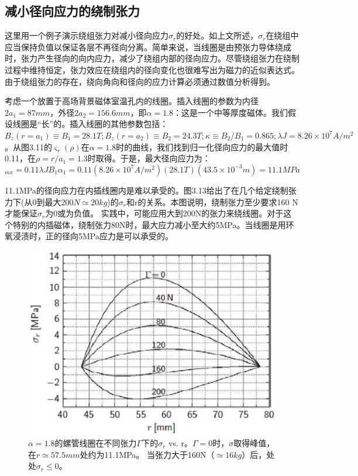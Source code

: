 \subsection{减小径向应力的绕制张力}
这里用一个例子演示绕组张力对减小径向应力$\sigma_{r}$的好处。如上文所述，$\sigma_{r}$在绕组中应当保持负值以保证各层不再径向分离。简单来说，当线圈是由预张力导体绕成时，张力产生径向的向内应力，减少了绕组内部的径向应力。尽管绕组张力在绕制过程中维持恒定，张力效应在绕组内的径向变化也很难写出为磁力的近似表达式。由于绕组张力的存在，绕向角向和径向的应力计算必须通过数值分析得到。

考虑一个放置于高场背景磁体室温孔内的线圈。插入线圈的参数为内径$2a_1=87 mm$，外径$2a_2=156.6 mm$，即$\alpha = 1.8$：这是一个中等厚度磁体。我们假设线圈是“长”的。插入线圈的其他参数包括：
$B_z(r=a_1)\equiv B_1 =28.1 T; B_z(r=a_2)\equiv B_2 =24.3 T;\kappa\equiv B_2/B_1 = 0.865; \lambda J =8.26×10^7 A/m^2$。从图3.11的$\varsigma_r(\rho)$在$\alpha=1.8$时的曲线，我们找到归一化径向应力的最大值时0.11，在$\rho=r/a_1=1.3$时取得。于是，最大径向应力为：
\begin{equation}
  [\sigma_r]_{mx}=0.11\lambda JB_1\alpha_1  =0.11(8.26\times 10^7 A/m^2)(28.1T)(43.5\times10^{-3}m)=11.1MPa%
\end{equation}

11.1MPa的径向应力在内插线圈内是难以承受的。图3.13给出了在几个给定绕制张力下(从0到最大$200 N\simeq 20 kg$)的$\sigma_{r}$和r的关系。本图说明，绕制张力至少要求160 N才能保证$\sigma_{r}$为0或为负值。
实践中，可能应用大到200N的张力来绕线圈。对于这个特别的内插磁体，绕制张力80N时，最大应力减小至大约5MPa。当线圈是用环氧浸渍时，正的径向5MPa应力是可以承受的。
\begin{figure}[htbp]
  \centering
 \includegraphics[scale=0.7]{chpt3/figs/fig3.13.eps}
  \caption{$\alpha=1.8$的螺管线圈在不同张力$\Gamma$下的$\sigma_r$ vs. r。$\Gamma=0$时，$\sigma$取得峰值，在$r\simeq 57.5 mm$处约为11.1MPa。
  当张力大于160N（$\simeq 16 kg$）后，处处$\sigma_r\le 0 $。}
\end{figure}




